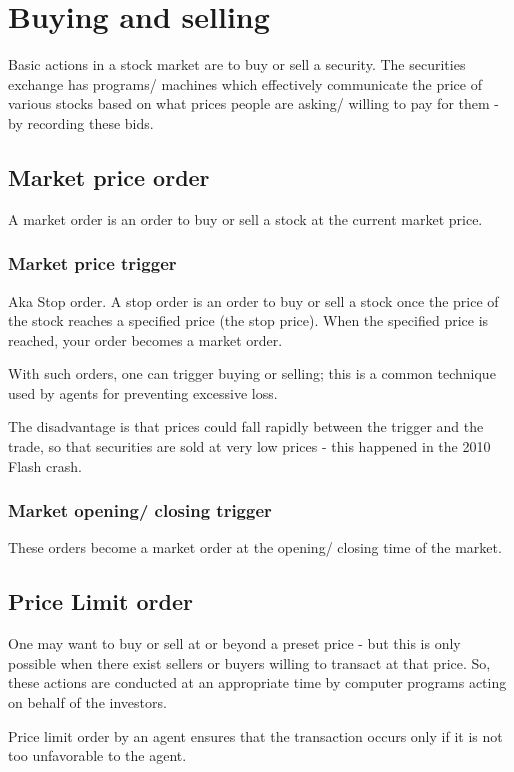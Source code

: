 \documentclass[oneside, article]{memoir}
\begin{document}
\section{Buying and selling}
Basic actions in a stock market are to buy or sell a security. The securities exchange has programs/ machines which effectively communicate the price of various stocks based on what prices people are asking/ willing to pay for them - by recording these bids.

\subsection{Market price order}
A market order is an order to buy or sell a stock at the current market price.

\subsubsection{Market price trigger}
Aka Stop order. A stop order is an order to buy or sell a stock once the price of the stock reaches a specified price (the stop price).  When the specified price is reached, your order becomes a market order.

With such orders, one can trigger buying or selling; this is a common technique used by agents for preventing excessive loss.

The disadvantage is that prices could fall rapidly between the trigger and the trade, so that securities are sold at very low prices - this happened in the 2010 Flash crash.

\subsubsection{Market opening/ closing trigger}
These orders become a market order at the opening/ closing time of the market.

\subsection{Price Limit order}
One may want to buy or sell at or beyond a preset price - but this is only possible when there exist sellers or buyers willing to transact at that price. So, these actions are conducted at an appropriate time by computer programs acting on behalf of the investors.

Price limit order by an agent ensures that the transaction occurs only if it is not too unfavorable to the agent.
\end{document}
